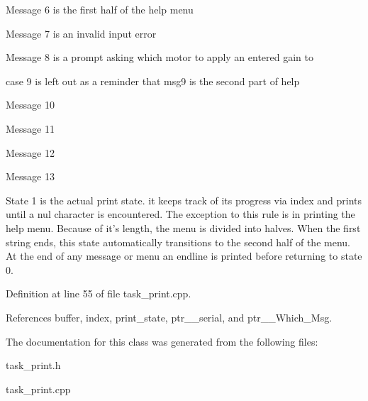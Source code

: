Message 6 is the first half of the help menu

Message 7 is an invalid input error

Message 8 is a prompt asking which motor to apply an entered gain to

case 9 is left out as a reminder that msg9 is the second part of help

Message 10

Message 11

Message 12

Message 13

State 1 is the actual print state. it keeps track of its progress via index and prints until a nul character is encountered. The exception to this rule is in printing the help menu. Because of it's length, the menu is divided into halves. When the first string ends, this state automatically transitions to the second half of the menu. At the end of any message or menu an endline is printed before returning to state 0.

Definition at line 55 of file task\-\_\-print.\-cpp.



References buffer, index, print\-\_\-state, ptr\-\_\-\_\-serial, and ptr\-\_\-\_\-\-Which\-\_\-\-Msg.



The documentation for this class was generated from the following files\-:\begin{DoxyCompactItemize}
\item 
task\-\_\-print.\-h\item 
task\-\_\-print.\-cpp\end{DoxyCompactItemize}
